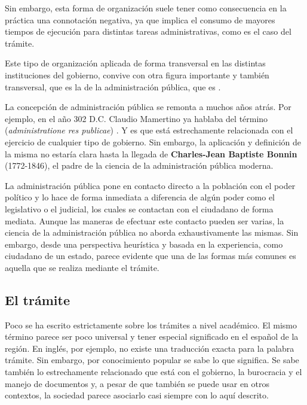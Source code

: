 Sin embargo, esta forma de organización suele tener como consecuencia en la práctica una connotación negativa, %
ya que implica el consumo de mayores tiempos de ejecución para distintas tareas administrativas, como es el caso del trámite.

Este tipo de organización aplicada de forma transversal en las distintas instituciones del gobierno,
convive con otra figura importante y también transversal, que es la de la administración pública,
que es  \cite{guerreroCharlesJeanBonninSiglo2020}.

La concepción de administración pública se remonta a muchos años atrás. 
Por ejemplo, en el año 302 D.C. Claudio Mamertino ya hablaba del término  (\textit{administratione res publicae}) \cite{nixonPraiseLaterRoman1994}. 
Y es que está estrechamente relacionada con el ejercicio de cualquier tipo de gobierno. 
Sin embargo, la aplicación y definición de la misma no estaría clara hasta la llegada de \textbf{Charles-Jean Baptiste Bonnin} (1772-1846), 
el padre de la ciencia de la administración pública moderna.

La administración pública pone en contacto directo a la población con el poder político \cite{mostajomachicadoDerechoAdministrativoAdministracion2016} 
y lo hace de forma inmediata a diferencia de algún poder como el legislativo o el judicial, los cuales se contactan con el ciudadano de forma mediata. 
Aunque las maneras de efectuar este contacto pueden ser varias, la ciencia de la administración pública no aborda exhaustivamente las mismas. 
Sin embargo, desde una perspectiva heurística y basada en la experiencia, como ciudadano de un estado, parece evidente que una de las formas más comunes es aquella que se realiza mediante el trámite.

\subsection{El trámite}

Poco se ha escrito estrictamente sobre los trámites a nivel académico. 
El mismo término parece ser poco universal y tener especial significado en el español de la región. 
En inglés, por ejemplo, no existe una traducción exacta para la palabra trámite. 
Sin embargo, por conocimiento popular se sabe lo que significa. 
Se sabe también lo estrechamente relacionado que está con el gobierno, la burocracia y el manejo de documentos y, 
a pesar de que también se puede usar en otros contextos, la sociedad parece asociarlo casi siempre con lo aquí descrito.

